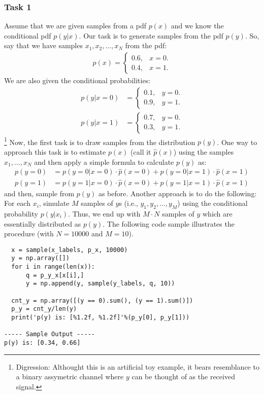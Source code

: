 \documentclass[11pt,onecolumn]{article}
\begin{document}
\subsubsection{Task 1}
Assume that we are given samples from a pdf $p(x)$ and we know the conditional pdf $p(y|x)$. Our task is to generate samples from the pdf $p(y)$. So, say that we have samples $x_1, x_2, \dots, x_N$ from the pdf:
\begin{align}
 p(x) = \begin{cases}
         0.6, & x = 0. \\
         0.4, & x = 1.
        \end{cases}
\end{align}
We are also given the conditional probabilities:
\begin{align}
 p(y|x = 0) &= \begin{cases}
         0.1, & y = 0. \\
         0.9, & y = 1.
        \end{cases} \\
 p(y|x = 1) &= \begin{cases}
         0.7, & y = 0. \\
         0.3, & y = 1.
        \end{cases}
\end{align}
\footnote{Digression: Althought this is an artificial toy example, it bears resemblance to a binary assymetric channel where $y$ can be thought of as the received signal.}
Now, the first task is to draw samples from the distribution $p(y)$. One way to approach this task is to estimate $p(x)$ (call it $\hat p(x)$) using the samples $x_1,\dots,x_N$ and then apply a simple formula to calculate $p(y)$ as:
\begin{align}
 p(y = 0) &= p(y = 0|x = 0) \cdot \hat p(x = 0) + p(y = 0|x = 1)\cdot \hat p(x = 1) \\
 p(y = 1) &= p(y = 1|x = 0) \cdot \hat p(x = 0) + p(y = 1|x = 1)\cdot \hat p(x = 1)
\end{align}
and then, sample from $p(y)$ as before. Another approach is to do the following:
For each $x_i$, simulate $M$ samples of $y$s (i.e., $y_1, y_2, \dots, y_M$) using the conditional probability $p(y|x_i)$. Thus, we end up with $M\cdot N$ samples of $y$ which are essentially distributed as $p(y)$.
The following code sample illustrates the procedure (with $N = 10000$ and $M = 10$).
\begin{verbatim}
  x = sample(x_labels, p_x, 10000)
  y = np.array([])
  for i in range(len(x)):
      q = p_y_x[x[i],]
      y = np.append(y, sample(y_labels, q, 10))

  cnt_y = np.array([(y == 0).sum(), (y == 1).sum()])
  p_y = cnt_y/len(y)
  print('p(y) is: [%1.2f, %1.2f]'%(p_y[0], p_y[1]))
  
----- Sample Output -----
p(y) is: [0.34, 0.66]

\end{verbatim}
\end{document}
